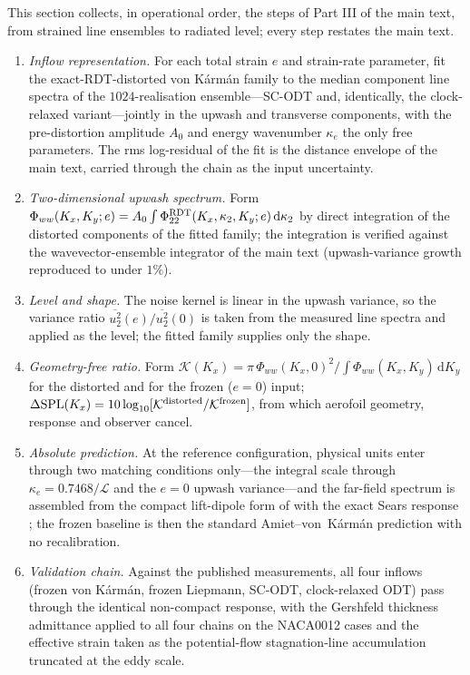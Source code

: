 \documentclass{JFM-FLM_Au}
\begin{document}
This section collects, in operational order, the steps of Part III of
the main text, from strained line ensembles to radiated level; every
step restates the main text.
\begin{enumerate}
\item \emph{Inflow representation.} For each total strain $e$ and
  strain-rate parameter, fit the exact-RDT-distorted von K\'arm\'an
  family to the median component line spectra of the
  $1024$-realisation ensemble---SC-ODT and, identically, the
  clock-relaxed variant---jointly in the upwash and transverse
  components, with the pre-distortion amplitude $A_0$ and energy
  wavenumber $\kappa_e$ the only free parameters. The rms log-residual
  of the fit is the distance envelope of the main text, carried
  through the chain as the input uncertainty.
\item \emph{Two-dimensional upwash spectrum.} Form
  $\Phi_{ww}(K_x,K_y;e)=A_0\int\Phi^{\rm RDT}_{22}
  (K_x,\kappa_2,K_y;e)\,\mathrm{d}\kappa_2$ by direct integration of
  the distorted components of the fitted family; the integration is
  verified against the wavevector-ensemble integrator of the main
  text (upwash-variance growth reproduced to under $1\%$).
\item \emph{Level and shape.} The noise kernel is linear in the
  upwash variance, so the variance ratio
  $\overline{u_2^2}(e)/\overline{u_2^2}(0)$ is taken from the
  measured line spectra and applied as the level; the fitted family
  supplies only the shape.
\item \emph{Geometry-free ratio.} Form
  $\mathcal K(K_x)=\pi\,\Phi_{ww}(K_x,0)^2\big/\!\int\Phi_{ww}
  (K_x,K_y)\,\mathrm{d}K_y$ for the distorted and for the frozen
  ($e=0$) input;
  $\Delta\mathrm{SPL}(K_x)=10\log_{10}
  [\mathcal K^{\rm distorted}/\mathcal K^{\rm frozen}]$, from which
  aerofoil geometry, response and observer cancel.
\item \emph{Absolute prediction.} At the reference configuration,
  physical units enter through two matching conditions only---the
  integral scale through $\kappa_e=0.7468/\mathcal{L}$ and the $e=0$
  upwash variance---and the far-field spectrum is assembled from the
  compact lift-dipole form of \citet{Amiet1975} with the exact Sears response \citep{Sears1941}; the frozen baseline is then the standard
  Amiet--von~K\'arm\'an prediction with no recalibration.
\item \emph{Validation chain.} Against the published measurements,
  all four inflows (frozen von K\'arm\'an, frozen Liepmann, SC-ODT,
  clock-relaxed ODT) pass through the identical non-compact response,
  with the Gershfeld thickness admittance applied to all four chains
  on the NACA0012 cases and the effective strain taken as the
  potential-flow stagnation-line accumulation truncated at the eddy
  scale.
\end{enumerate}
\end{document}
